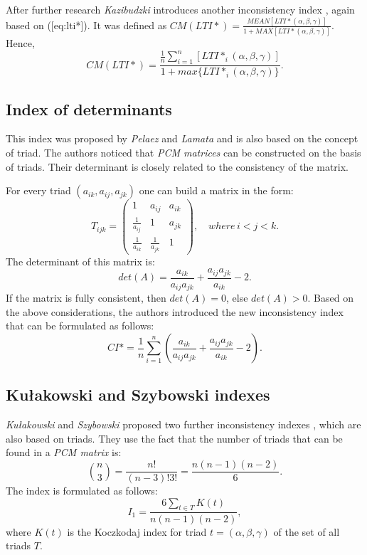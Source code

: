 After further research \textit{Kazibudzki} introduces another inconsistency index \cite{Kazibudzki2017}, again based on ([eq:lti*]). It was defined as $CM(LTI*)=\frac{MEAN[LTI*(\alpha,\beta,\gamma)]}{1+MAX[LTI*(\alpha,\beta,\gamma)]}$. Hence,
	\begin{equation} 
		CM(LTI*)=\frac{\frac{1}{n}\sum_{i=1}^{n}[LTI*_{i}(\alpha,\beta,\gamma)]}{1+max\{LTI*_{i}(\alpha,\beta,\gamma)\}}.
	 \end{equation}
 

\subsection{Index of determinants}

This index was proposed by \textit{Pelaez} and \textit{Lamata} \cite{PELAEZ2003} and is also based on the concept of triad. The authors noticed that \textit{PCM  matrices} can be constructed on the basis of triads. Their determinant is closely related to the consistency of the matrix.

For every triad $(a_{ik},a_{ij},a_{jk})$ one can build a matrix in the form: 
	\begin{equation} 
		T_{ijk}=\left(\begin{array}{ccc}
			1 & a_{ij} & a_{ik}\\
			\frac{1}{a_{ij}} & 1 & a_{jk}\\
			\frac{1}{a_{ik}} & \frac{1}{a_{jk}} & 1
		\end{array}\right),\,\,\,\,\,\,where\,i<j<k.
	\end{equation}
 The determinant of this matrix is:
	\begin{equation} 
		det(A)=\frac{a_{ik}}{a_{ij}a_{jk}}+\frac{a_{ij}a_{jk}}{a_{ik}}-2.
	 \end{equation}
 If the matrix is fully consistent, then $det(A)=0$, else $det(A)>0$. Based on the above considerations, the authors introduced the new inconsistency index that can be formulated as follows:
 	\begin{equation} 
		CI*=\frac{1}{n}\sum_{i=1}^{n}\left(\frac{a_{ik}}{a_{ij}a_{jk}}+\frac{a_{ij}a_{jk}}{a_{ik}}-2\right).
	 \end{equation}
 

\subsection{Kułakowski and Szybowski indexes}

\textit{Kułakowski} and \textit{Szybowski} proposed two further inconsistency indexes \cite{KULAKOWSKI20141}, which are also based on triads. They use the fact that the number of triads that can be found in a \textit{PCM matrix} is:
	\begin{equation} 
		\binom{n}{3}=\frac{n!}{(n-3)!3!}=\frac{n(n-1)(n-2)}{6}.
	 \end{equation}
 The index is formulated as follows:
 	\begin{equation} 
		I_{1}=\frac{6\sum_{t\in T}K(t)}{n(n-1)(n-2)},
	 \end{equation}
 where $K(t)$ is the Koczkodaj index for triad $t=(\alpha,\beta,\gamma)$ of the set of all triads $T$. 

